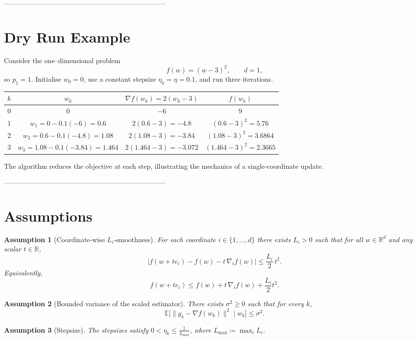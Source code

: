 \documentclass{article}
\newtheorem{assumption}{Assumption}
\newcommand{\E}{\mathbb{E}}
\newcommand{\R}{\mathbb{R}}
\begin{document}
-----------------------------------------------------------------------

\section*{Dry Run Example}
Consider the one–dimensional problem
\[
f(w)=(w-3)^2,\qquad d=1,
\]
so $p_1=1$.  Initialise $w_0=0$, use a constant stepsize $\eta_k=\eta=0.1$,
and run three iterations.

\begin{center}
\begin{tabular}{c|c|c|c}
$k$ & $w_k$ & $\nabla f(w_k)=2(w_k-3)$ & $f(w_k)$\\\hline
0 & $0$ & $-6$ & $9$\\
1 & $w_1=0-0.1(-6)=0.6$ & $2(0.6-3)=-4.8$ & $(0.6-3)^2=5.76$\\
2 & $w_2=0.6-0.1(-4.8)=1.08$ & $2(1.08-3)=-3.84$ & $(1.08-3)^2=3.6864$\\
3 & $w_3=1.08-0.1(-3.84)=1.464$ & $2(1.464-3)=-3.072$ & $(1.464-3)^2=2.3665$
\end{tabular}
\end{center}
The algorithm reduces the objective at each step, illustrating the
mechanics of a single‑coordinate update.

-----------------------------------------------------------------------

\section*{Assumptions}
\begin{assumption}[Coordinate‑wise $L_i$‑smoothness]\label{ass:smooth}
For each coordinate $i\in\{1,\dots ,d\}$ there exists $L_i>0$ such that for all
$w\in\R^{d}$ and any scalar $t\in\R$,
\[
\bigl|f(w+te_i)-f(w)-t\,\nabla_i f(w)\bigr|\le \frac{L_i}{2}\,t^{2}.
\tag{2}
\]
Equivalently,
\[
f(w+te_i)\le f(w)+t\,\nabla_i f(w)+\frac{L_i}{2}t^{2}.
\]
\end{assumption}

\begin{assumption}[Bounded variance of the scaled estimator]\label{ass:var}
There exists $\sigma^{2}\ge0$ such that for every $k$,
\[
\E\!\bigl[\|g_k-\nabla f(w_k)\|^{2}\mid w_k\bigr]\le\sigma^{2}.
\tag{3}
\]
\end{assumption}

\begin{assumption}[Stepsize]\label{ass:stepsize}
The stepsizes satisfy $0<\eta_k\le \frac{1}{L_{\max}}$, where
$L_{\max}\coloneqq\max_{i}L_i$.
\end{assumption}
\end{document}
